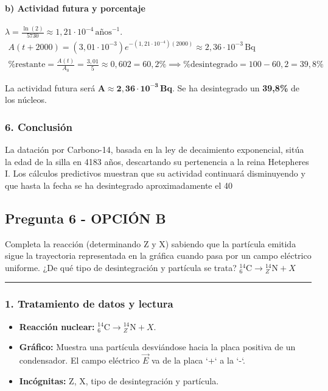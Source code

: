 \paragraph{b) Actividad futura y porcentaje}
$\lambda = \frac{\ln(2)}{5730} \approx 1,21\cdot10^{-4}\,\text{años}^{-1}$.
\begin{gather}
    A(t+2000) = (3,01\cdot10^{-3}) e^{-(1,21\cdot10^{-4})(2000)} \approx 2,36\cdot10^{-3}\,\text{Bq} \\
    \% \text{restante} = \frac{A(t)}{A_0} = \frac{3,01}{5} \approx 0,602 = 60,2\% \implies \% \text{desintegrado} = 100 - 60,2 = 39,8\%
\end{gather}
\begin{cajaresultado}
    La actividad futura será $\boldsymbol{A \approx 2,36\cdot10^{-3}\,\textbf{Bq}}$. Se ha desintegrado un \textbf{39,8\%} de los núcleos.
\end{cajaresultado}
\subsubsection*{6. Conclusión}
\begin{cajaconclusion}
La datación por Carbono-14, basada en la ley de decaimiento exponencial, sitúa la edad de la silla en 4183 años, descartando su pertenencia a la reina Hetepheres I. Los cálculos predictivos muestran que su actividad continuará disminuyendo y que hasta la fecha se ha desintegrado aproximadamente el 40%
\end{cajaconclusion}
\newpage

\subsection{Pregunta 6 - OPCIÓN B}
\label{subsec:6B_2018_jul_ext}
\begin{cajaenunciado}
Completa la reacción (determinando Z y X) sabiendo que la partícula emitida sigue la trayectoria representada en la gráfica cuando pasa por un campo eléctrico uniforme. ¿De qué tipo de desintegración y partícula se trata?
${}_{6}^{14}\text{C}\rightarrow{}_{Z}^{14}\text{N}+X$
\end{cajaenunciado}
\hrule
\subsubsection*{1. Tratamiento de datos y lectura}
\begin{itemize}
    \item \textbf{Reacción nuclear:} ${}_{6}^{14}\text{C}\rightarrow{}_{Z}^{14}\text{N}+X$.
    \item \textbf{Gráfico:} Muestra una partícula desviándose hacia la placa positiva de un condensador. El campo eléctrico $\vec{E}$ va de la placa `+` a la `-`.
    \item \textbf{Incógnitas:} Z, X, tipo de desintegración y partícula.
\end{itemize}
